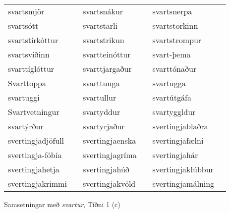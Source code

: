 \documentclass[../samsetningasafn.tex]{subfiles}
\begin{document}
\begin{wordlist}[H]
\begin{tcolorbox}
\begin{tabular}{BlBlBl}
		svartsmjör	&		& 
		svartsnákur	&		& 
		svartsnerpa	&		\\  %
		svartsótt		&		& 
		svartstarli		&		& 
		svartstorkinn	&		\\  %
		svartstirkóttur	&		& 
		svartstrikun	&		& 
		svartstrompur	&		\\  %
		svartsviðinn	&		& 
		svartteinóttur	&		& 
		svart-þema	&		\\  %
		svarttíglóttur	&		& 
		svarttjargaður	&		& 
		svarttónaður	&		\\  %
		Svarttoppa	& 		& 
		svarttunga	&		& 
		svartugga	&		\\  %
		svartuggi		& 		& 
		svartullur		&		& 
		svartútgáfa	&		\\  %
		Svartvetningur	&		& 
		svartyddur	&		& 
		svartyggldur	&		\\  %
		svartýrður	&		& 
		svartyrjaður	&		& 	
		svertingjablaðra & 		\\  %
		svertingjadjöfull &		& 
		svertingjaenska & 		& 
		svertingjafælni	 &		\\  %
		svertingja-fóbía & 		& 
		svertingjagríma & 		& 
		svertingjahár & 		\\  %
		svertingjahetja & 		& 
		svertingjahúð & 		& 
		svertingjaklúbbur & 	\\  %
		svertingjakrimmi & 		& 
		svertingjakvöld & 		& 
		svertingjamálning & 	  %
	\end{tabular}
\end{tcolorbox}
	\caption{Samsetningar með \textit{svartur}, Tíðni 1 (c)}
	\label{listi:svart.1c}
\end{wordlist}		
		
\end{document}
